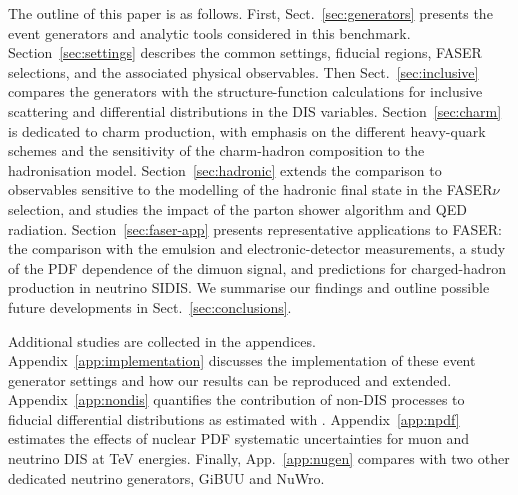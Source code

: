 The outline of this paper is as follows.
%
First, Sect.~\ref{sec:generators} presents the event generators and analytic tools considered in this benchmark.
%
Section~\ref{sec:settings} describes the common settings, fiducial regions, FASER selections, and the associated physical observables.
%
Then Sect.~\ref{sec:inclusive} compares the generators with the structure-function calculations for inclusive scattering and differential distributions in the DIS variables.
%
Section~\ref{sec:charm} is dedicated to charm production, with emphasis on the different heavy-quark schemes and the sensitivity of the charm-hadron composition to the hadronisation model.
%
Section~\ref{sec:hadronic} extends the comparison to observables sensitive to the modelling of the hadronic final state in the FASER$\nu$ selection, and studies the impact of the parton shower algorithm and QED radiation.
%
Section~\ref{sec:faser-app} presents representative applications to FASER: the comparison with the emulsion and electronic-detector measurements, a study of the PDF dependence of the dimuon signal, and predictions for charged-hadron production in neutrino SIDIS. 
%
We summarise our findings and outline possible future developments in Sect.~\ref{sec:conclusions}.

Additional studies are collected in the appendices.
%
Appendix~\ref{app:implementation} discusses the implementation of these event generator settings and how our results can be reproduced and extended.
%
Appendix~\ref{app:nondis} quantifies the contribution of non-DIS processes to fiducial differential distributions as estimated with \genie.
%
Appendix~\ref{app:npdf} estimates the effects of nuclear PDF systematic uncertainties for muon and neutrino DIS at TeV energies.
%
Finally, App.~\ref{app:nugen} compares \genie with two other dedicated neutrino generators, {\sc\small GiBUU} and {\sc\small NuWro}.
